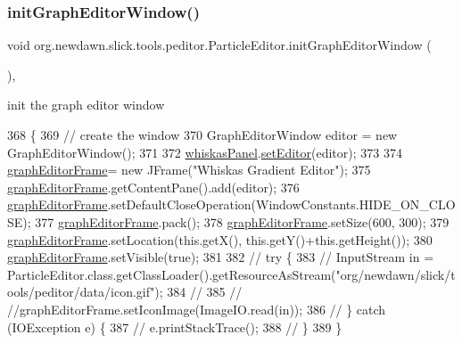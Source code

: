 \subsubsection{\texorpdfstring{init\+Graph\+Editor\+Window()}{initGraphEditorWindow()}}
{\footnotesize\ttfamily void org.\+newdawn.\+slick.\+tools.\+peditor.\+Particle\+Editor.\+init\+Graph\+Editor\+Window (\begin{DoxyParamCaption}{ }\end{DoxyParamCaption})\hspace{0.3cm}{\ttfamily [inline]}, {\ttfamily [private]}}

init the graph editor window 
\begin{DoxyCode}
368     \{
369         \textcolor{comment}{// create the window}
370         GraphEditorWindow editor = \textcolor{keyword}{new} GraphEditorWindow();
371 
372         \mbox{\hyperlink{classorg_1_1newdawn_1_1slick_1_1tools_1_1peditor_1_1_particle_editor_a6c7ab37c6cad16814266c87eced04ffe}{whiskasPanel}}.\mbox{\hyperlink{classorg_1_1newdawn_1_1slick_1_1tools_1_1peditor_1_1_whiskas_panel_a4686898fc7dbd9aa6fd3ca5d3f850e50}{setEditor}}(editor);
373 
374         \mbox{\hyperlink{classorg_1_1newdawn_1_1slick_1_1tools_1_1peditor_1_1_particle_editor_a9af7e0bdb25c87f134a7bd1b81585a29}{graphEditorFrame}}= \textcolor{keyword}{new} JFrame(\textcolor{stringliteral}{"Whiskas Gradient Editor"});
375         \mbox{\hyperlink{classorg_1_1newdawn_1_1slick_1_1tools_1_1peditor_1_1_particle_editor_a9af7e0bdb25c87f134a7bd1b81585a29}{graphEditorFrame}}.getContentPane().add(editor);
376         \mbox{\hyperlink{classorg_1_1newdawn_1_1slick_1_1tools_1_1peditor_1_1_particle_editor_a9af7e0bdb25c87f134a7bd1b81585a29}{graphEditorFrame}}.setDefaultCloseOperation(WindowConstants.HIDE\_ON\_CLOSE);
377         \mbox{\hyperlink{classorg_1_1newdawn_1_1slick_1_1tools_1_1peditor_1_1_particle_editor_a9af7e0bdb25c87f134a7bd1b81585a29}{graphEditorFrame}}.pack();
378         \mbox{\hyperlink{classorg_1_1newdawn_1_1slick_1_1tools_1_1peditor_1_1_particle_editor_a9af7e0bdb25c87f134a7bd1b81585a29}{graphEditorFrame}}.setSize(600, 300);
379         \mbox{\hyperlink{classorg_1_1newdawn_1_1slick_1_1tools_1_1peditor_1_1_particle_editor_a9af7e0bdb25c87f134a7bd1b81585a29}{graphEditorFrame}}.setLocation(this.getX(), this.getY()+this.getHeight());
380         \mbox{\hyperlink{classorg_1_1newdawn_1_1slick_1_1tools_1_1peditor_1_1_particle_editor_a9af7e0bdb25c87f134a7bd1b81585a29}{graphEditorFrame}}.setVisible(\textcolor{keyword}{true});
381         
382 \textcolor{comment}{//      try \{}
383 \textcolor{comment}{//          InputStream in =
       ParticleEditor.class.getClassLoader().getResourceAsStream("org/newdawn/slick/tools/peditor/data/icon.gif");}
384 \textcolor{comment}{//          }
385 \textcolor{comment}{//          //graphEditorFrame.setIconImage(ImageIO.read(in));}
386 \textcolor{comment}{//      \} catch (IOException e) \{}
387 \textcolor{comment}{//          e.printStackTrace();}
388 \textcolor{comment}{//      \}}
389     \}
\end{DoxyCode}
